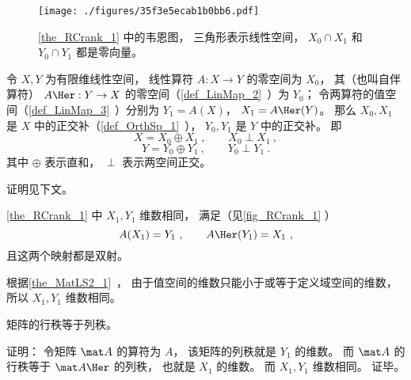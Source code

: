 

\begin{figure}[ht]
\centering
\texttt{[image: ./figures/35f3e5ecab1b0bb6.pdf]}
\caption{\autoref{the_RCrank_1} 中的韦恩图， 三角形表示线性空间， $X_0\cap X_1$ 和 $Y_0\cap  Y_1$ 都是零向量。} \label{fig_RCrank_1}
\end{figure}

\begin{theorem}{}\label{the_RCrank_1}
令 $X, Y$ 为有限维线性空间， 线性算符 $A:X \to Y$ 的零空间为 $X_0$， 其（也叫自伴算符） $A\Her: Y \to X$ 的零空间（\autoref{def_LinMap_2}~）为 $Y_0$； 令两算符的值空间（\autoref{def_LinMap_3}~）分别为 $Y_1 = A(X)$， $X_1 = A\Her(Y)$。 那么 $X_0, X_1$ 是 $X$ 中的正交补（\autoref{def_OrthSp_1}~）， $Y_0, Y_1$ 是 $Y$ 中的正交补。 即
\begin{equation}
X = X_0 \oplus X_1~, \qquad X_0 \perp X_1~,
\end{equation}
\begin{equation}
Y = Y_0 \oplus Y_1~, \qquad Y_0 \perp Y_1~.
\end{equation}
其中 $\oplus$ 表示直和， $\perp$ 表示两空间正交。
\end{theorem}
证明见下文。

\begin{corollary}{}
\autoref{the_RCrank_1} 中 $X_1, Y_1$ 维数相同， 满足（见\autoref{fig_RCrank_1} ）
\begin{equation}\label{eq_RCrank_3}
A(X_1) = Y_1~, \qquad A\Her (Y_1) = X_1~,
\end{equation}
且这两个映射都是双射。
\end{corollary}
根据\autoref{the_MatLS2_1}~， 
由于值空间的维数只能小于或等于定义域空间的维数， 所以 $X_1, Y_1$ 维数相同。

\begin{corollary}{}\label{cor_RCrank_1}
矩阵的行秩等于列秩。
\end{corollary}
证明： 令矩阵 $\mat A$ 的算符为 $A$， 该矩阵的列秩就是 $Y_1$ 的维数。 而 $\mat A$ 的行秩等于 $\mat A\Her$ 的列秩， 也就是 $X_1$ 的维数。 而 $X_1, Y_1$ 维数相同。 证毕。

